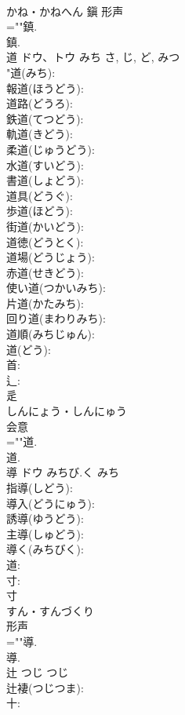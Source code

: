 \documentclass[8pt]{extreport}
\begin{document}
\begin{CJK}{UTF8}{min}
\\	かね・かねへん	鎭	形声 
\\	=""鎮.
\\	鎮.
\\	道	ドウ、トウ	みち	さ, じ, ど, みつ	
\\	"道(みち): 
\\	報道(ほうどう): 
\\	道路(どうろ): 
\\	鉄道(てつどう): 
\\	軌道(きどう): 
\\	柔道(じゅうどう): 
\\	水道(すいどう): 
\\	書道(しょどう): 
\\	道具(どうぐ): 
\\	歩道(ほどう): 
\\	街道(かいどう): 
\\	道徳(どうとく): 
\\	道場(どうじょう): 
\\	赤道(せきどう): 
\\	使い道(つかいみち): 
\\	片道(かたみち): 
\\	回り道(まわりみち): 
\\	道順(みちじゅん): 
\\	道(どう): 
\\	首: 
\\	辶: 
\\	辵	
\\	しんにょう・しんにゅう	
\\	会意 
\\	=""道.
\\	道.
\\	導	ドウ	みちび.く	みち	
\\	指導(しどう): 
\\	導入(どうにゅう): 
\\	誘導(ゆうどう): 
\\	主導(しゅどう): 
\\	導く(みちびく): 
\\	道: 
\\	寸: 
\\	寸	
\\	すん・すんづくり	
\\	形声 
\\	=""導.
\\	導.
\\	辻	つじ	つじ		
\\	辻褄(つじつま): 
\\	十: 

\end{CJK}
\end{document}
